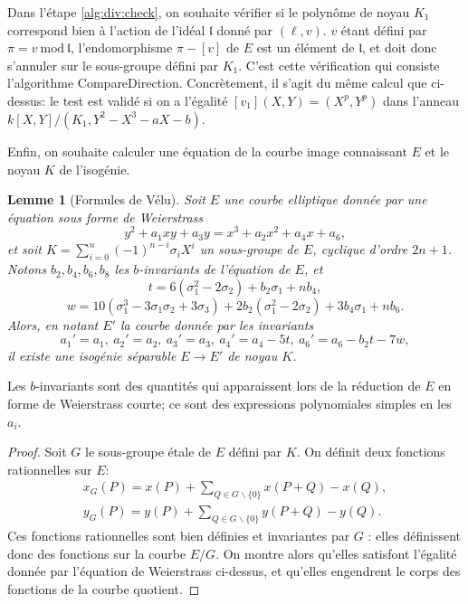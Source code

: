 \documentclass[11pt,a4paper]{article}
\newcommand{\vers}{\longrightarrow}
\renewcommand{\frak}{\mathfrak}
\renewcommand{\mod}{\ \mathrm{mod}\ }
\renewcommand{\v}{\vspace{5mm}}
\newtheorem*{lem}{Lemme}
\theoremstyle{definition}
\begin{document}
Dans l'étape \ref{alg:div:check}, on souhaite vérifier si le polynôme de noyau $K_1$ correspond bien à l'action de l'idéal $\frak l$ donné par $(\ell,v)$. $v$ étant défini par $\pi = v \mod \frak l$, l'endomorphisme $\pi - [v]$ de $E$ est un élément de $\frak l$, et doit donc s'annuler sur le sous-groupe défini par $K_1$. C'est cette vérification qui consiste l'algorithme {\sc CompareDirection}. Concrètement, il s'agit du même calcul que ci-dessus: le test est validé si on a l'égalité $[v_1](X, Y) = (X^p, Y^p)$ dans l'anneau $k[X, Y]/(K_1, Y^2 - X^3 - aX - b)$.
\v

Enfin, on souhaite calculer une équation de la courbe image connaissant $E$ et le noyau $K$ de l'isogénie.

\begin{lem}[Formules de Vélu]
Soit $E$ une courbe elliptique donnée par une équation sous forme de Weierstrass
$$y^2 + a_1 x y + a_3 y = x^3 + a_2 x^2 + a_4 x + a_6,$$
et soit $K = \sum_{i=0}^n (-1)^{n-i} \sigma_i X^i$ un sous-groupe de $E$, cyclique d'ordre $2n+1$. Notons $b_2, b_4, b_6, b_8$ les $b$-invariants de l'équation de $E$, et 
$$ t = 6(\sigma_1^2 - 2 \sigma_2) + b_2 \sigma_1 + n b_4,$$
$$ w = 10 (\sigma_1^3 - 3 \sigma_1 \sigma_2 + 3 \sigma_3) + 2  b_2 (\sigma_1^2 - 2 \sigma_2) + 3 b_4 \sigma_1 + n b_6.$$
Alors, en notant $E'$ la courbe donnée par les invariants
$$ a_1' = a_1,\ a_2' = a_2,\ a_3' = a_3,\ a_4' = a_4 - 5 t,\ a_6' = a_6 - b_2 t - 7 w,$$
il existe une isogénie séparable $E\vers E'$ de noyau $K$.
\end{lem}

Les $b$-invariants sont des quantités qui apparaissent lors de la réduction de $E$ en forme de Weierstrass courte; ce sont des expressions polynomiales simples en les $a_i$.

\begin{proof}
Soit $G$ le sous-groupe étale de $E$ défini par $K$. On définit deux fonctions rationnelles sur $E$:
$$\begin{aligned}
x_G(P) = x(P) + \sum_{Q\in G\backslash \{0\}} x(P+Q) - x(Q),\\
y_G(P) = y(P) + \sum_{Q\in G\backslash \{0\}} y(P+Q) - y(Q).
\end{aligned}$$
Ces fonctions rationnelles sont bien définies et invariantes par $G$ : elles définissent donc des fonctions sur la courbe $E/G$. On montre alors qu'elles satisfont l'égalité donnée par l'équation de Weierstrass ci-dessus, et qu'elles engendrent le corps des fonctions de la courbe quotient.
\end{proof}
\v
\end{document}
